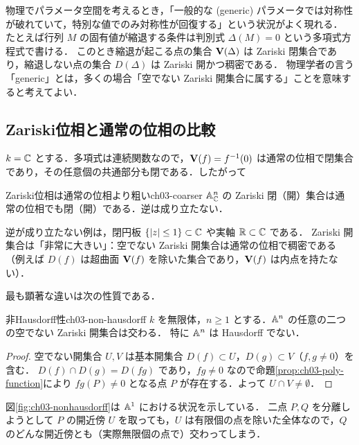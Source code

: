 \begin{physbox}[一般の点と特別な点]
物理でパラメータ空間を考えるとき，「一般的な (generic) パラメータでは対称性が破れていて，特別な値でのみ対称性が回復する」という状況がよく現れる．
たとえば行列 $M$ の固有値が縮退する条件は判別式 $\Delta(M)=0$ という多項式方程式で書ける．
このとき縮退が起こる点の集合 $\mathbf{V}(\Delta)$ は Zariski 閉集合であり，縮退しない点の集合 $D(\Delta)$ は Zariski 開かつ稠密である．
物理学者の言う「generic」とは，多くの場合「空でない Zariski 開集合に属する」ことを意味すると考えてよい．
\end{physbox}

\subsection{Zariski位相と通常の位相の比較}

$k=\mathbb{C}$ とする．多項式は連続関数なので，$\mathbf{V}(f)=f^{-1}(0)$ は通常の位相で閉集合であり，その任意個の共通部分も閉である．したがって

\begin{myprop}{Zariski位相は通常の位相より粗い}{ch03-coarser}
$\mathbb{A}^n_{\mathbb{C}}$ の Zariski 閉（開）集合は通常の位相でも閉（開）である．逆は成り立たない．
\end{myprop}

逆が成り立たない例は，閉円板 $\{|z|\le1\}\subset\mathbb{C}$ や実軸 $\mathbb{R}\subset\mathbb{C}$ である．
Zariski 開集合は「非常に大きい」：空でない Zariski 開集合は通常の位相で稠密である（例えば $D(f)$ は超曲面 $\mathbf{V}(f)$ を除いた集合であり，$\mathbf{V}(f)$ は内点を持たない）．

最も顕著な違いは次の性質である．

\begin{myprop}{非Hausdorff性}{ch03-non-hausdorff}
$k$ を無限体，$n\ge1$ とする．$\mathbb{A}^n$ の任意の二つの空でない Zariski 開集合は交わる．
特に $\mathbb{A}^n$ は Hausdorff でない．
\end{myprop}

\begin{proof}
空でない開集合 $U,V$ は基本開集合 $D(f)\subset U$，$D(g)\subset V$（$f,g\ne0$）を含む．
$D(f)\cap D(g)=D(fg)$ であり，$fg\ne0$ なので命題\ref{prop:ch03-poly-function}により $fg(P)\ne0$ となる点 $P$ が存在する．よって $U\cap V\ne\emptyset$．
\end{proof}

図\ref{fig:ch03-nonhausdorff}は $\mathbb{A}^1$ における状況を示している．
二点 $P,Q$ を分離しようとして $P$ の開近傍 $U$ を取っても，$U$ は有限個の点を除いた全体なので，$Q$ のどんな開近傍とも（実際無限個の点で）交わってしまう．

